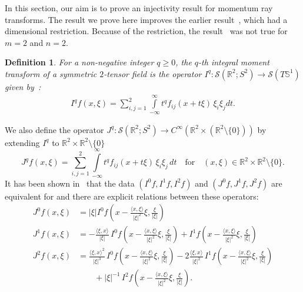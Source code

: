 \documentclass[11pt]{article}
\newcommand{\tred}[1]{{\color{red}{#1}}}
\newcommand{\Sc}{\mathcal{S}}
\newcommand{\Rb}{\mathbb{R}}
\newcommand{\Sb}{\mathbb{S}}
\newtheorem{definition}[theorem]{Definition}
\begin{document}
In this section, our aim is to prove an injectivity result for momentum ray transforms. The result we prove here improves the earlier result~\cite[Theorem 4.3]{Rohit_Suman}, which had a dimensional restriction. Because of the restriction, the result~\cite[Theorem 4.3]{Rohit_Suman} was not true for $m=2$ and $n=2$. 

\begin{definition}\label{def:integral moments}
For a non-negative integer $q \geq 0$, the $q$-th integral moment transform of a symmetric $2$-tensor field is the  operator $I^q :{\Sc}(\mathbb{R}^2;S^2)\rightarrow{\Sc}(T\Sb^1)$ given by~\cite{Sharafutdinov_1986_momentum}:
\begin{align}\label{eq:def momentum ray}
 I^q f(x,\xi)=  \sum_{i,j=1}^2\int\limits_{-\infty}^\infty t^q f_{ij}(x+t\xi)\,\xi_{i}\xi_{j} dt.
\end{align}
\end{definition}
\noindent We also define the operator $J^q: \Sc(\mathbb{R}^2;S^2) \longrightarrow C^\infty(\Rb^2 \times (\Rb^{2} \setminus \{0\}))$ by extending $I^q$ to  $ \Rb^2 \times \Rb^2\setminus\{0\} $ 
\begin{equation}\label{eq:definition of Jk}
J^q f(x,\xi)= \sum_{i,j=1}^2\int\limits_{-\infty}^\infty t^qf_{ij}(x+t\xi)\,\xi_{i}\xi_{j}  \, d t \quad\mbox{for}\quad(x,\xi)\in \mathbb{R}^{2} \times \mathbb{R}^{2}\setminus \{0\}.
\end{equation} 
It has been shown in~\cite[Equation 2.6]{KMSS} that the data $(I^0 f, I^1 f, I^2 f)$ and $(J^0 f, J^1 f, J^2 f)$ are equivalent for and there are explicit relations between these operators:
\begin{align*}
    	J^0\!f(x,\xi)&=|\xi| I^0\!f
	\left(x-\frac{\langle x, \xi \rangle}{|\xi|^2}\xi,\frac{\xi}{|\xi|}\right)\\
J^1\!f(x,\xi)&=-\frac{\langle\xi,x\rangle}{|\xi|}\,I^0\!f \left(x-\frac{\langle x, \xi \rangle}{|\xi|^2}\xi,\frac{\xi}{|\xi|}\right) + I^1\!f
	\left(x-\frac{\langle x, \xi \rangle}{|\xi|^2}\xi,\frac{\xi}{|\xi|}\right)\\
J^2\!f(x,\xi)&=\frac{\langle\xi,x\rangle^{2}}{|\xi|^3}\,I^0\!f \left(x-\frac{\langle x, \xi \rangle}{|\xi|^2}\xi,\frac{\xi}{|\xi|}\right) - 2\frac{\langle\xi,x\rangle}{|\xi|^2}\,I^1\!f
	\left(x-\frac{\langle x, \xi \rangle}{|\xi|^2}\xi,\frac{\xi}{|\xi|}\right)\\
    &\qquad + |\xi|^{-1}\,I^2\!f
	\left(x-\frac{\langle x, \xi \rangle}{|\xi|^2}\xi,\frac{\xi}{|\xi|}\right).
\end{align*}
\end{document}
